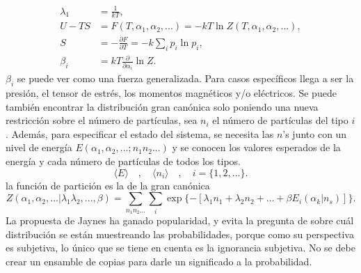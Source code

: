 \begin{align*}
\lambda_{1} &=\frac{1}{kT}, \\
U-TS &= F(T,\alpha_{1},\alpha_{2},...)=-kT \ln Z(T,\alpha_{1},\alpha_{2},...), \\
S &= -\frac{\partial F}{\partial T}=-k\sum_{i} p_{i} \ln p_{i}, \\
\beta_{i} &= kT \frac{\partial }{\partial \alpha_{i}} \ln Z.
\end{align*}
$\beta_{i}$ se puede ver como una fuerza generalizada. Para casos específicos llega a ser la presión, el tensor de estrés, los momentos magnéticos y/o  eléctricos. Se puede también encontrar la distribución gran canónica solo poniendo una nueva restricción sobre el número de partículas, sea $n_{i}$ el número de partículas del tipo $i$. Además, para especificar el estado del sistema, se necesita las $n$'s junto con un nivel de energía $E(\alpha_{1},\alpha_{2},...;n_{1}n_{2}...)$ y se conocen los valores esperados de la energía y cada número de partículas de todos los tipos.
\begin{equation}
\langle E \rangle \quad , \quad \langle n_{i} \rangle \quad , \quad i=  \{ 1,2,... \}.
\end{equation}
la función de partición es la de la gran canónica
\begin{equation}
Z(\alpha_{1},\alpha_{2},...|\lambda_{1} \lambda_{2} ,...,\beta )= \sum_{n_{1} n_{2}...} \sum_{i} \exp \{ -[ \lambda_{1} n_{1}+\lambda_{2} n_{2}+...+\beta E_{i} (\alpha_{k} | n_{s} ) ] \}.
\end{equation}
La propuesta de Jaynes ha ganado popularidad, y evita la pregunta de sobre cuál distribución se están muestreando las probabilidades, porque como su perspectiva es subjetiva, lo único que se tiene en cuenta es la ignorancia subjetiva. No se debe crear un ensamble de copias para darle un significado a la probabilidad.



